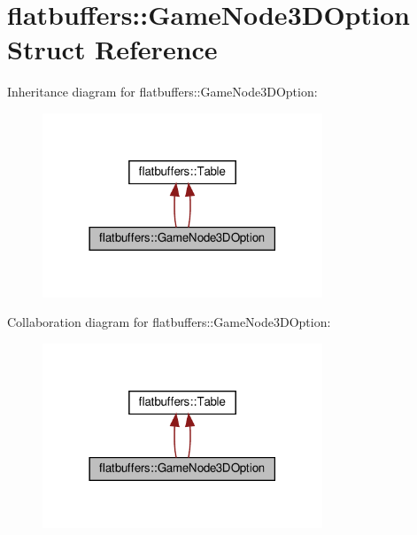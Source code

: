 \hypertarget{structflatbuffers_1_1GameNode3DOption}{}\section{flatbuffers\+:\+:Game\+Node3\+D\+Option Struct Reference}
\label{structflatbuffers_1_1GameNode3DOption}


Inheritance diagram for flatbuffers\+:\+:Game\+Node3\+D\+Option\+:
\nopagebreak
\begin{figure}[H]
\begin{center}
\leavevmode
\includegraphics[width=237pt]{structflatbuffers_1_1GameNode3DOption__inherit__graph}
\end{center}
\end{figure}


Collaboration diagram for flatbuffers\+:\+:Game\+Node3\+D\+Option\+:
\nopagebreak
\begin{figure}[H]
\begin{center}
\leavevmode
\includegraphics[width=237pt]{structflatbuffers_1_1GameNode3DOption__coll__graph}
\end{center}
\end{figure}
